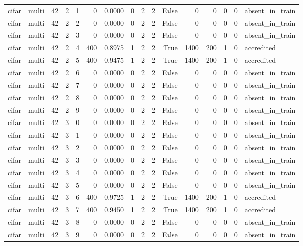 \begin{tabular}{llrrrrrrrrrrrrrl}
cifar & multi & 42 & 2 & 1 & 0 & 0.0000 & 0 & 2 & 2 & False & 0 & 0 & 0 & 0 & absent\_in\_train \\
cifar & multi & 42 & 2 & 2 & 0 & 0.0000 & 0 & 2 & 2 & False & 0 & 0 & 0 & 0 & absent\_in\_train \\
cifar & multi & 42 & 2 & 3 & 0 & 0.0000 & 0 & 2 & 2 & False & 0 & 0 & 0 & 0 & absent\_in\_train \\
cifar & multi & 42 & 2 & 4 & 400 & 0.8975 & 1 & 2 & 2 & True & 1400 & 200 & 1 & 0 & accredited \\
cifar & multi & 42 & 2 & 5 & 400 & 0.9475 & 1 & 2 & 2 & True & 1400 & 200 & 1 & 0 & accredited \\
cifar & multi & 42 & 2 & 6 & 0 & 0.0000 & 0 & 2 & 2 & False & 0 & 0 & 0 & 0 & absent\_in\_train \\
cifar & multi & 42 & 2 & 7 & 0 & 0.0000 & 0 & 2 & 2 & False & 0 & 0 & 0 & 0 & absent\_in\_train \\
cifar & multi & 42 & 2 & 8 & 0 & 0.0000 & 0 & 2 & 2 & False & 0 & 0 & 0 & 0 & absent\_in\_train \\
cifar & multi & 42 & 2 & 9 & 0 & 0.0000 & 0 & 2 & 2 & False & 0 & 0 & 0 & 0 & absent\_in\_train \\
cifar & multi & 42 & 3 & 0 & 0 & 0.0000 & 0 & 2 & 2 & False & 0 & 0 & 0 & 0 & absent\_in\_train \\
cifar & multi & 42 & 3 & 1 & 0 & 0.0000 & 0 & 2 & 2 & False & 0 & 0 & 0 & 0 & absent\_in\_train \\
cifar & multi & 42 & 3 & 2 & 0 & 0.0000 & 0 & 2 & 2 & False & 0 & 0 & 0 & 0 & absent\_in\_train \\
cifar & multi & 42 & 3 & 3 & 0 & 0.0000 & 0 & 2 & 2 & False & 0 & 0 & 0 & 0 & absent\_in\_train \\
cifar & multi & 42 & 3 & 4 & 0 & 0.0000 & 0 & 2 & 2 & False & 0 & 0 & 0 & 0 & absent\_in\_train \\
cifar & multi & 42 & 3 & 5 & 0 & 0.0000 & 0 & 2 & 2 & False & 0 & 0 & 0 & 0 & absent\_in\_train \\
cifar & multi & 42 & 3 & 6 & 400 & 0.9725 & 1 & 2 & 2 & True & 1400 & 200 & 1 & 0 & accredited \\
cifar & multi & 42 & 3 & 7 & 400 & 0.9450 & 1 & 2 & 2 & True & 1400 & 200 & 1 & 0 & accredited \\
cifar & multi & 42 & 3 & 8 & 0 & 0.0000 & 0 & 2 & 2 & False & 0 & 0 & 0 & 0 & absent\_in\_train \\
cifar & multi & 42 & 3 & 9 & 0 & 0.0000 & 0 & 2 & 2 & False & 0 & 0 & 0 & 0 & absent\_in\_train \\

\end{tabular}
